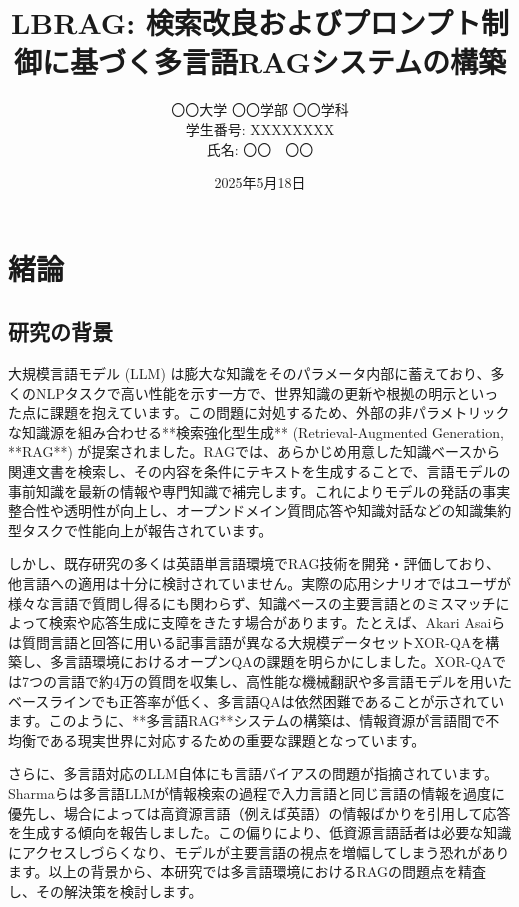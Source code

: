 \documentclass[12pt]{bxjsreport}
\title{LBRAG: 検索改良およびプロンプト制御に基づく多言語RAGシステムの構築}
\author{〇〇大学 〇〇学部 〇〇学科\\学生番号: XXXXXXXX\\氏名: 〇〇　〇〇}
\date{2025年5月18日}
\begin{document}
\maketitle

\tableofcontents
\newpage

\chapter{緒論}

\section{研究の背景}

大規模言語モデル (LLM) は膨大な知識をそのパラメータ内部に蓄えており、多くのNLPタスクで高い性能を示す一方で、世界知識の更新や根拠の明示といった点に課題を抱えています。この問題に対処するため、外部の非パラメトリックな知識源を組み合わせる**検索強化型生成** (Retrieval-Augmented Generation, **RAG**) が提案されました。RAGでは、あらかじめ用意した知識ベースから関連文書を検索し、その内容を条件にテキストを生成することで、言語モデルの事前知識を最新の情報や専門知識で補完します。これによりモデルの発話の事実整合性や透明性が向上し、オープンドメイン質問応答や知識対話などの知識集約型タスクで性能向上が報告されています。

しかし、既存研究の多くは英語単言語環境でRAG技術を開発・評価しており、他言語への適用は十分に検討されていません。実際の応用シナリオではユーザが様々な言語で質問し得るにも関わらず、知識ベースの主要言語とのミスマッチによって検索や応答生成に支障をきたす場合があります。たとえば、Akari Asaiらは質問言語と回答に用いる記事言語が異なる大規模データセットXOR-QAを構築し、多言語環境におけるオープンQAの課題を明らかにしました。XOR-QAでは7つの言語で約4万の質問を収集し、高性能な機械翻訳や多言語モデルを用いたベースラインでも正答率が低く、多言語QAは依然困難であることが示されています。このように、**多言語RAG**システムの構築は、情報資源が言語間で不均衡である現実世界に対応するための重要な課題となっています。

さらに、多言語対応のLLM自体にも言語バイアスの問題が指摘されています。Sharmaらは多言語LLMが情報検索の過程で入力言語と同じ言語の情報を過度に優先し、場合によっては高資源言語（例えば英語）の情報ばかりを引用して応答を生成する傾向を報告しました。この偏りにより、低資源言語話者は必要な知識にアクセスしづらくなり、モデルが主要言語の視点を増幅してしまう恐れがあります。以上の背景から、本研究では多言語環境におけるRAGの問題点を精査し、その解決策を検討します。
\end{document}
